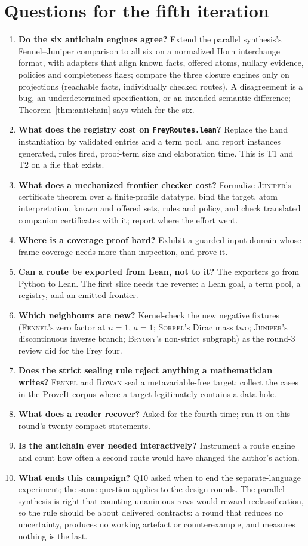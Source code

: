 \documentclass[11pt,a4paper]{article}
\newcommand{\code}[1]{\nolinkurl{#1}}
\newcommand{\Br}{\textsc{Bryony}}
\newcommand{\Fe}{\textsc{Fennel}}
\newcommand{\Ju}{\textsc{Juniper}}
\newcommand{\Ro}{\textsc{Rowan}}
\newcommand{\So}{\textsc{Sorrel}}
\theoremstyle{definition}
\theoremstyle{plain}
\begin{document}
\section{Questions for the fifth iteration}\label{sec:q5}
\begin{enumerate}[label=\textbf{U\arabic*.},itemsep=.5em]
\item \textbf{Do the six antichain engines agree?} Extend the parallel synthesis's Fennel--Juniper comparison to all six on a normalized Horn interchange format, with adapters that align known facts, offered atoms, nullary evidence, policies and completeness flags; compare the three closure engines only on projections (reachable facts, individually checked routes). A disagreement is a bug, an underdetermined specification, or an intended semantic difference; Theorem~\ref{thm:antichain} says which for the six.
\item \textbf{What does the registry cost on \code{FreyRoutes.lean}?} Replace the hand instantiation by validated entries and a term pool, and report instances generated, rules fired, proof-term size and elaboration time. This is T1 and T2 on a file that exists.
\item \textbf{What does a mechanized frontier checker cost?} Formalize \Ju's certificate theorem over a finite-profile datatype, bind the target, atom interpretation, known and offered sets, rules and policy, and check translated companion certificates with it; report where the effort went.
\item \textbf{Where is a coverage proof hard?} Exhibit a guarded input domain whose frame coverage needs more than inspection, and prove it.
\item \textbf{Can a route be exported from Lean, not to it?} The exporters go from Python to Lean. The first slice needs the reverse: a Lean goal, a term pool, a registry, and an emitted frontier.
\item \textbf{Which neighbours are new?} Kernel-check the new negative fixtures (\Fe's zero factor at $n=1$, $a=1$; \So's Dirac mass two; \Ju's discontinuous inverse branch; \Br's non-strict subgraph) as the round-3 review did for the Frey four.
\item \textbf{Does the strict sealing rule reject anything a mathematician writes?} \Fe{} and \Ro{} seal a metavariable-free target; collect the cases in the ProveIt corpus where a target legitimately contains a data hole.
\item \textbf{What does a reader recover?} Asked for the fourth time; run it on this round's twenty compact statements.
\item \textbf{Is the antichain ever needed interactively?} Instrument a route engine and count how often a second route would have changed the author's action.
\item \textbf{What ends this campaign?} Q10 asked when to end the separate-language experiment; the same question applies to the design rounds. The parallel synthesis is right that counting unanimous rows would reward reclassification, so the rule should be about delivered contracts: a round that reduces no uncertainty, produces no working artefact or counterexample, and measures nothing is the last.
\end{enumerate}
\end{document}
